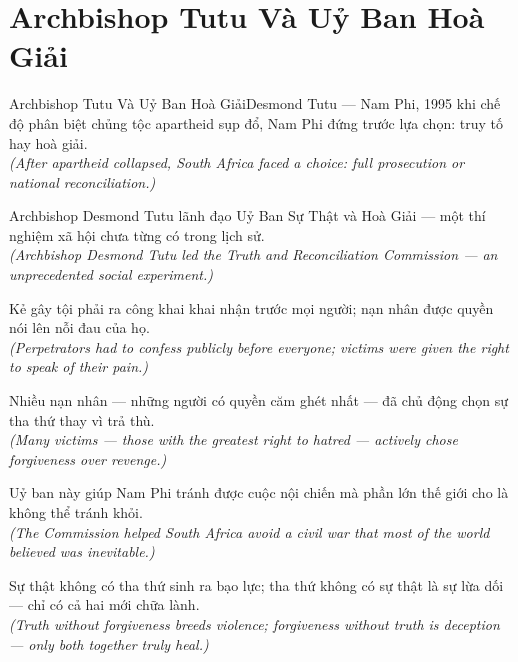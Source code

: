 \section{Archbishop Tutu Và Uỷ Ban Hoà Giải}
\begin{truyen}{Archbishop Tutu Và Uỷ Ban Hoà Giải}{Desmond Tutu --- Nam Phi, 1995}
 khi chế độ phân biệt chủng tộc apartheid sụp đổ, Nam Phi đứng trước lựa chọn: truy tố hay hoà giải.\\[4pt]
\textit{(After apartheid collapsed, South Africa faced a choice: full prosecution or national reconciliation.)}

Archbishop Desmond Tutu lãnh đạo Uỷ Ban Sự Thật và Hoà Giải --- một thí nghiệm xã hội chưa từng có trong lịch sử.\\[4pt]
\textit{(Archbishop Desmond Tutu led the Truth and Reconciliation Commission --- an unprecedented social experiment.)}

Kẻ gây tội phải ra công khai khai nhận trước mọi người; nạn nhân được quyền nói lên nỗi đau của họ.\\[4pt]
\textit{(Perpetrators had to confess publicly before everyone; victims were given the right to speak of their pain.)}

Nhiều nạn nhân --- những người có quyền căm ghét nhất --- đã chủ động chọn sự tha thứ thay vì trả thù.\\[4pt]
\textit{(Many victims --- those with the greatest right to hatred --- actively chose forgiveness over revenge.)}

Uỷ ban này giúp Nam Phi tránh được cuộc nội chiến mà phần lớn thế giới cho là không thể tránh khỏi.\\[4pt]
\textit{(The Commission helped South Africa avoid a civil war that most of the world believed was inevitable.)}

\end{truyen}
\begin{baihoc}
  Sự thật không có tha thứ sinh ra bạo lực; tha thứ không có sự thật là sự lừa dối --- chỉ có cả hai mới chữa lành.\\[4pt]
  \textit{(Truth without forgiveness breeds violence; forgiveness without truth is deception --- only both together truly heal.)}
\end{baihoc}

